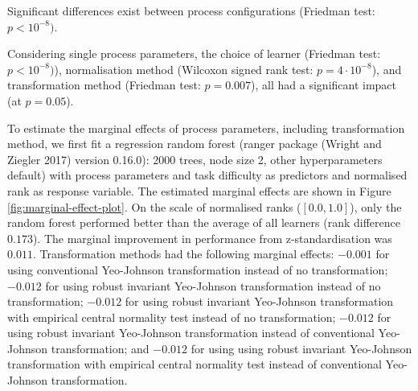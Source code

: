 \documentclass[
  a4paper,
]{article}
\begin{document}
Significant differences exist between process configurations (Friedman
test: \(p < 10^{-8})\).

Considering single process parameters, the choice of learner (Friedman
test: \(p < 10^{-8})\)), normalisation method (Wilcoxon signed rank
test: \(p = 4 \cdot 10^{-8}\)), and transformation method (Friedman
test: \(p = 0.007\)), all had a significant impact (at \(p = 0.05\)).

To estimate the marginal effects of process parameters, including
transformation method, we first fit a regression random forest (ranger
package (Wright and Ziegler 2017) version 0.16.0): 2000 trees, node size
2, other hyperparameters default) with process parameters and task
difficulty as predictors and normalised rank as response variable. The
estimated marginal effects are shown in Figure
\ref{fig:marginal-effect-plot}. On the scale of normalised ranks
(\([0.0, 1.0]\)), only the random forest performed better than the
average of all learners (rank difference \(0.173\)). The marginal
improvement in performance from z-standardisation was \(0.011\).
Transformation methods had the following marginal effects: \(-0.001\)
for using conventional Yeo-Johnson transformation instead of no
transformation; \(-0.012\) for using robust invariant Yeo-Johnson
transformation instead of no transformation; \(-0.012\) for using robust
invariant Yeo-Johnson transformation with empirical central normality
test instead of no transformation; \(-0.012\) for using robust invariant
Yeo-Johnson transformation instead of conventional Yeo-Johnson
transformation; and \(-0.012\) for using using robust invariant
Yeo-Johnson transformation with empirical central normality test instead
of conventional Yeo-Johnson transformation.
\end{document}

